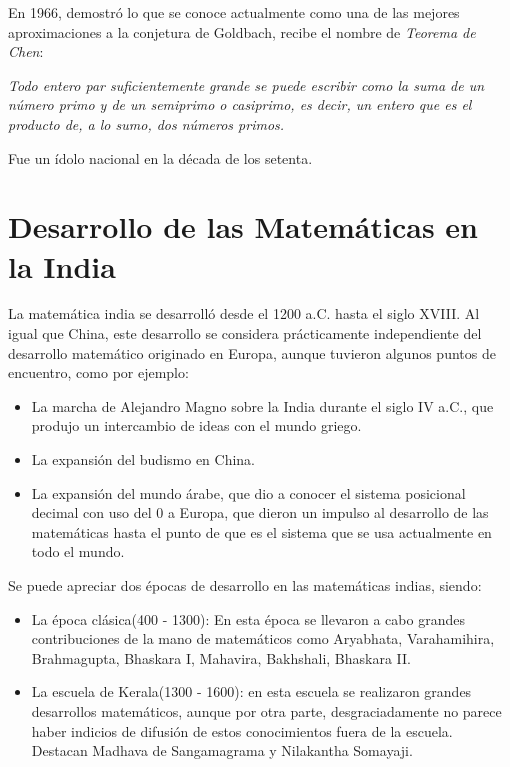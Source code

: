 \documentclass[a4paper, 11pt]{article}
\begin{document}
		En 1966, demostró lo que se conoce actualmente como una de las mejores aproximaciones a la conjetura de Goldbach,
		recibe el nombre de \textit{Teorema de Chen}:
		
		\begin{center}
			\em
			Todo entero par suficientemente grande se puede escribir como la suma de un número primo y de un semiprimo
			o casiprimo, es decir, un entero que es el producto de, a lo sumo, dos números primos.
		\end{center} 
		
		Fue un ídolo nacional en la década de los setenta.

\newpage				
\section{Desarrollo de las Matemáticas en la India}
	La matemática india se desarrolló desde el 1200 a.C. hasta el siglo XVIII. Al igual que China, este desarrollo se
	considera prácticamente independiente del desarrollo matemático originado en Europa, aunque tuvieron algunos
	puntos de encuentro, como por ejemplo:
	\begin{itemize}
		\item La marcha de Alejandro Magno sobre la India durante el siglo IV a.C., que produjo un intercambio de ideas
		con el mundo griego.
		\item La expansión del budismo en China.
		\item La expansión del mundo árabe, que dio a conocer el sistema posicional decimal con uso del 0 a Europa, que
		dieron un impulso al desarrollo de las matemáticas hasta el punto de que es el sistema que se usa actualmente
		en todo el mundo.
	\end{itemize}	

	Se puede apreciar dos épocas de desarrollo en las matemáticas indias, siendo:
	\begin{itemize}
		\item La época clásica(400 - 1300): En esta época se llevaron a cabo grandes contribuciones de la mano de
		matemáticos como Aryabhata, Varahamihira, Brahmagupta, Bhaskara I, Mahavira, Bakhshali, Bhaskara II.
		\item La escuela de Kerala(1300 - 1600): en esta escuela se realizaron grandes desarrollos matemáticos, aunque
		por otra parte, desgraciadamente no parece haber indicios de difusión de estos conocimientos fuera de la escuela.
		Destacan Madhava de Sangamagrama y Nilakantha Somayaji.
	\end{itemize}
\end{document}
